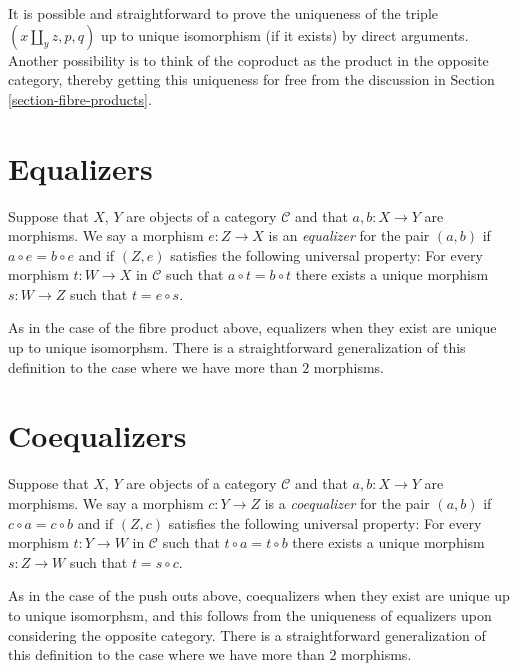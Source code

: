 \noindent
It is possible and straightforward to prove the uniqueness of the triple
$(x\amalg_y z, p, q)$ up to unique isomorphism (if it exists) by direct
arguments. Another possibility is to think of the coproduct as the
product in the opposite category, thereby getting this uniqueness for
free from the discussion in Section \ref{section-fibre-products}.

\section{Equalizers}
\label{section-equalizers}

\begin{definition}
\label{definition-equalizers}
Suppose that $X$, $Y$ are objects of a category $\mathcal{C}$
and that $a, b : X \to Y$ are morphisms. We say a morphism
$e : Z \to X$ is an {\it equalizer} for the pair $(a,b)$ if
$a \circ e = b \circ e$ and if $(Z,e)$ satisfies the following
universal property: For every morphism $t : W \to X$
in $\mathcal{C}$ such that $a \circ t = b \circ t$ there exists
a unique morphism $s : W \to Z$ such that $t = e \circ s$.
\end{definition}

\noindent
As in the case of the fibre product above, equalizers when
they exist are unique up to unique isomorphsm. There is a
straightforward generalization of this definition to the
case where we have more than $2$ morphisms.

\section{Coequalizers}
\label{section-coequalizers}

\begin{definition}
\label{definition-coequalizers}
Suppose that $X$, $Y$ are objects of a category $\mathcal{C}$
and that $a, b : X \to Y$ are morphisms. We say a morphism
$c : Y \to Z$ is a {\it coequalizer} for the pair $(a,b)$ if
$c \circ a = c \circ b$ and if $(Z,c)$ satisfies the following
universal property: For every morphism $t : Y \to W$
in $\mathcal{C}$ such that $t \circ a = t \circ b$ there exists
a unique morphism $s : Z \to W$ such that $t = s \circ c$.
\end{definition}

\noindent
As in the case of the push outs above, coequalizers when
they exist are unique up to unique isomorphsm, and this follows
from the uniqueness of equalizers upon considering the opposite
category. There is a straightforward generalization of this definition
to the case where we have more than $2$ morphisms.

